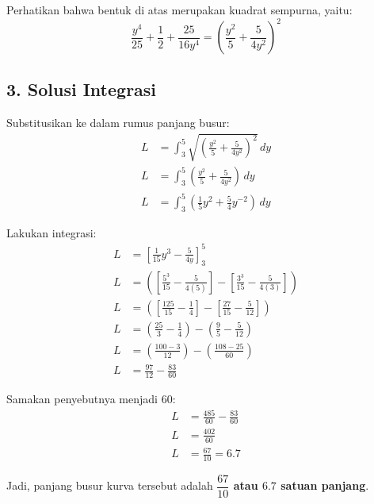 \documentclass[12pt,a4paper]{article}
\begin{document}
Perhatikan bahwa bentuk di atas merupakan kuadrat sempurna, yaitu:
\begin{equation*}
  \frac{y^4}{25} + \frac{1}{2} + \frac{25}{16y^4} = \left(\frac{y^2}{5} + \frac{5}{4y^2}\right)^2
\end{equation*}

\subsection*{3. Solusi Integrasi}
Substitusikan ke dalam rumus panjang busur:
\begin{align*}
  L &= \int_{3}^{5} \sqrt{\left(\frac{y^2}{5} + \frac{5}{4y^2}\right)^2} \, dy \\
  L &= \int_{3}^{5} \left(\frac{y^2}{5} + \frac{5}{4y^2}\right) \, dy \\
  L &= \int_{3}^{5} \left(\frac{1}{5}y^2 + \frac{5}{4}y^{-2}\right) \, dy
\end{align*}

Lakukan integrasi:
\begin{align*}
  L &= \left[ \frac{1}{15}y^3 - \frac{5}{4y} \right]_{3}^{5} \\
  L &= \left( \left[ \frac{5^3}{15} - \frac{5}{4(5)} \right] - \left[ \frac{3^3}{15} - \frac{5}{4(3)} \right] \right) \\
  L &= \left( \left[ \frac{125}{15} - \frac{1}{4} \right] - \left[ \frac{27}{15} - \frac{5}{12} \right] \right) \\
  L &= \left( \frac{25}{3} - \frac{1}{4} \right) - \left( \frac{9}{5} - \frac{5}{12} \right) \\
  L &= \left( \frac{100 - 3}{12} \right) - \left( \frac{108 - 25}{60} \right) \\
  L &= \frac{97}{12} - \frac{83}{60}
\end{align*}

Samakan penyebutnya menjadi 60:
\begin{align*}
  L &= \frac{485}{60} - \frac{83}{60} \\
  L &= \frac{402}{60} \\
  L &= \frac{67}{10} = 6.7
\end{align*}

Jadi, panjang busur kurva tersebut adalah \textbf{$\dfrac{67}{10}$ atau $6.7$ satuan panjang}.
\end{document}
